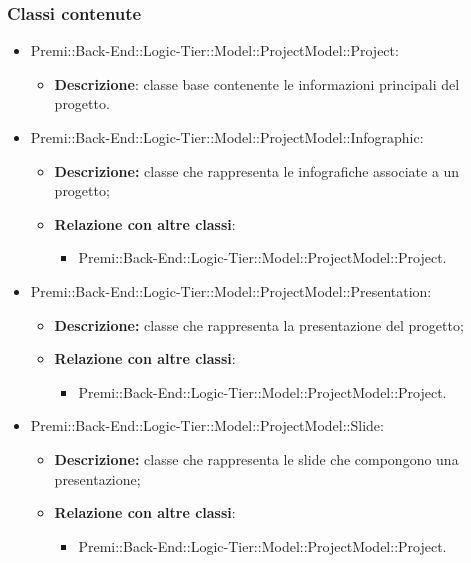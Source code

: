 	\subsubsection*{Classi contenute}
	\begin{itemize}
		\item Premi::Back-End::Logic-Tier::Model::ProjectModel::Project:
		\begin{itemize}
			\item \textbf{Descrizione}: classe base contenente le informazioni principali del progetto.
		\end{itemize}
			
		\item Premi::Back-End::Logic-Tier::Model::ProjectModel::Infographic:
		\begin{itemize}
			\item \textbf{Descrizione:} classe che rappresenta le infografiche associate a un progetto;
			\item \textbf{Relazione con altre classi}:
			\begin{itemize}
				\item Premi::Back-End::Logic-Tier::Model::ProjectModel::Project.
			\end{itemize}
		\end{itemize}
		
		\item Premi::Back-End::Logic-Tier::Model::ProjectModel::Presentation:
		\begin{itemize}
			\item \textbf{Descrizione:} classe che rappresenta la presentazione del progetto;
			\item \textbf{Relazione con altre classi}:
			\begin{itemize}
				\item Premi::Back-End::Logic-Tier::Model::ProjectModel::Project.
			\end{itemize}
		\end{itemize}
		
		\item Premi::Back-End::Logic-Tier::Model::ProjectModel::\gls{Slide}:
		\begin{itemize}
			\item \textbf{Descrizione:} classe che rappresenta le \gls{slide} che compongono una presentazione;
			\item \textbf{Relazione con altre classi}:
			\begin{itemize}
				\item Premi::Back-End::Logic-Tier::Model::ProjectModel::Project.
			\end{itemize}
		\end{itemize}
		

\end{itemize}
